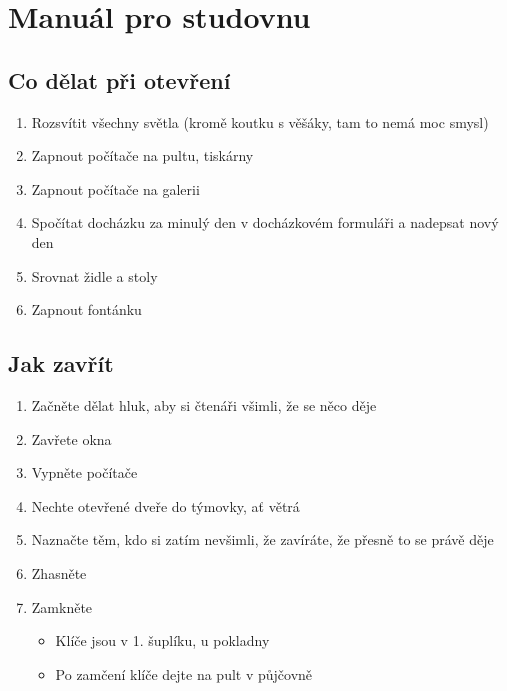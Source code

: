 \documentclass{article}
\begin{document}
\section{Manuál pro studovnu}

\subsection{Co dělat při otevření}

\begin{enumerate}

\item Rozsvítit všechny světla (kromě koutku s věšáky, tam to nemá moc smysl)

\item Zapnout počítače na pultu, tiskárny

\item Zapnout počítače na galerii

\item Spočítat docházku za minulý den v docházkovém formuláři a nadepsat nový den

\item Srovnat židle a stoly

\item Zapnout fontánku
\end{enumerate}


\subsection{Jak zavřít}
\begin{enumerate}

\item Začněte dělat hluk, aby si čtenáři všimli, že se něco děje

\item Zavřete okna

\item Vypněte počítače
\item Nechte otevřené dveře do týmovky, ať větrá
\item Naznačte těm, kdo si zatím nevšimli, že zavíráte, že přesně to se právě děje
\item Zhasněte
\item Zamkněte
  \begin{itemize}
    \item Klíče jsou v 1. šuplíku, u pokladny
    \item Po zamčení klíče dejte na pult v půjčovně 
  \end{itemize}
\end{enumerate}
\end{document}
